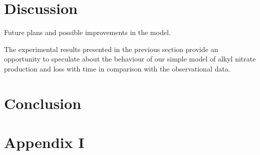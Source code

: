 \documentclass[11pt,a4paper]{article}
\begin{document}
\section{Discussion} \label{sec:discuss}
Future plans and possible improvements in the model.

The experimental results presented in the previous section provide an opportunity to speculate about the behaviour of our simple model of alkyl nitrate production and loss with time in comparison with the observational data. 

\section{Conclusion} \label{sec:conclusion}


\section{Appendix I} \label{sec:appendix1}
\end{document}
